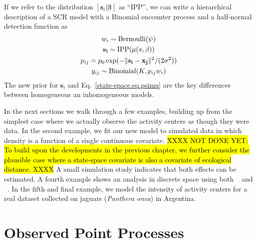 If we refer to the distribution $[\mathbf{s}_i | \bm{\beta}]$ as
``IPP'', we can write a hierarchical description of a SCR model with a
Binomial encounter process and a half-normal detection function as
\begin{gather*}
w_i \sim \mbox{Bernoulli}(\psi) \\
{\bf s_i} \sim \mbox{IPP}(\mu(s,\beta)) \\
p_{ij} = p_0 \exp(-\|{\bf s_i} - {\bf x_{j}}\|^2/(2\sigma^2)) \\
y_{ij} \sim \mbox{Binomial}(K, p_{ij} w_i)
\end{gather*}
The new prior for $\mathbf{s}_i$ and Eq.~\ref{state-space.eq.psimu}
are the key differences between homogeneous an inhomogeneous
models. %

In the next sections we walk through a few examples, building up from
the simplest case where we actually observe the activity centers as
though they were data. In the second example, we fit our new model to simulated
data in which density is a function of a single continuous
covariate. \hl{XXXX NOT DONE YET: To build upon the developments in the previous chapter, we
further consider the plausible case where a state-space covariate is also a
covariate of ecological distance. XXXX} A small simulation study indicates
that both effects can be estimated. A fourth example shows an analysis in discrete space using
both \secr~\citep{efford:2011} and \jags~\citep{plummer:2003}. In the
fifth and final example, we model the intensity of
activity centers for a real dataset collected on jaguars
(\emph{Panthera onca}) in Argentina.

\section{Observed Point Processes}

